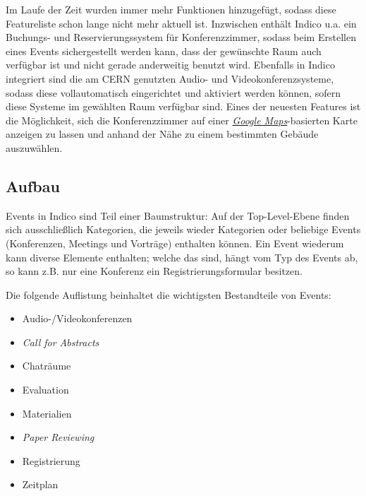 Im Laufe der Zeit wurden immer mehr Funktionen hinzugefügt, sodass diese Featureliste schon lange
nicht mehr aktuell ist. Inzwischen enthält Indico u.a. ein Buchungs- und Reservierungssystem für
Konferenzzimmer, sodass beim Erstellen eines Events sichergestellt werden kann, dass der gewünschte
Raum auch verfügbar ist und nicht gerade anderweitig benutzt wird. Ebenfalls in Indico integriert
sind die am CERN genutzten Audio- und Videokonferenzsysteme, sodass diese vollautomatisch
eingerichtet und aktiviert werden können, sofern diese Systeme im gewählten Raum verfügbar sind.
Eines der neuesten Features ist die Möglichkeit, sich die Konferenzzimmer auf einer
\href{http://maps.google.com/}{\emph{Google Maps}}-basierten Karte anzeigen zu lassen und anhand der
Nähe zu einem bestimmten Gebäude auszuwählen.

\subsection{Aufbau}
Events in Indico sind Teil einer Baumstruktur: Auf der Top-Level-Ebene finden sich ausschließlich
Kategorien, die jeweils wieder Kategorien oder beliebige Events (Konferenzen, Meetings und
Vorträge) enthalten können. Ein Event wiederum kann diverse Elemente enthalten; welche das sind,
hängt vom Typ des Events ab, so kann z.B. nur eine Konferenz ein Registrierungsformular
besitzen.

\newpage
Die folgende Auflistung beinhaltet die wichtigsten Bestandteile von Events:
\begin{itemize}
\item Audio-/Videokonferenzen
\item \emph{Call for Abstracts}
\item Chaträume
\item Evaluation
\item Materialien
\item \emph{Paper Reviewing}
\item Registrierung
\item Zeitplan
\end{itemize}

